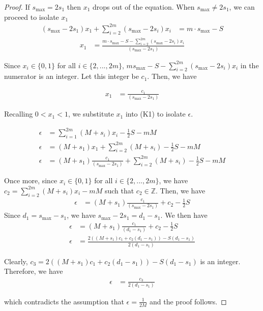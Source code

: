 \documentclass[3p, twocolumn]{elsarticle}
\begin{document}
\begin{proof}
If $s_{\max} = 2s_1$ then $x_1$ drops out of the equation.  When $s_{\max} \ne 2s_1$, we can proceed to isolate $x_1$
\begin{align*}
  (s_{\max} - 2s_1)x_1 + \sum_{i=2}^{2m} (s_{\max} - 2s_i)x_i&= m\cdot s_{\max} - S
\end{align*}
\begin{align*}
  x_1 &= \frac{m\cdot s_{\max} - S - \sum_{i=2}^{2m} (s_{\max} - 2s_i)x_i}{(s_{\max} - 2s_1)}
\end{align*}

Since $x_i \in \{0,1\}$ for all $i\in\{2,...,2m\}$, $m s_{\max} - S - \sum_{i=2}^{2m} (s_{\max} - 2s_i)x_i$ in the numerator is an integer. Let this integer be $c_1$. Then, we have

\begin{align*}
    x_1 &= \frac{c_1}{(s_{\max} - 2s_1)}
\end{align*}

Recalling $0<x_1<1$, we substitute $x_1$ into (K1) to isolate $\epsilon$.

\begin{align*}
    \epsilon &= \sum_{i=1}^{2m}(M+s_i)x_i - \frac{1}{2}S - mM \\
    \epsilon &= (M+s_1)x_1 + \sum_{i=2}^{2m}(M+s_i) - \frac{1}{2}S - mM\\
    \epsilon &= (M+s_1)\frac{c_1}{(s_{\max} - 2s_1)} + \sum_{i=2}^{2m}(M+s_i) - \frac{1}{2}S - mM 
\end{align*}

Once more, since $x_i \in \{0,1\}$ for all $i\in\{2,...,2m\}$, we have $\displaystyle c_2 = \sum_{i=2}^{2m} (M + s_i)x_i - mM$ such that $c_2 \in \mathbb{Z}$. Then, we have
\begin{align*}
    \epsilon &= (M+s_1)\frac{c_1}{(s_{\max} - 2s_1)} + c_2 - \frac{1}{2}S
\end{align*}
Since $d_1 = s_{\max} - s_1$, we have  $s_{\max} - 2s_1 = d_1 - s_1$. We then have 
\begin{align*}
    \epsilon &= (M+s_1)\frac{c_1}{(d_1 - s_1)} + c_2 - \frac{1}{2}S\\
    \epsilon &= \frac{2((M+s_1)c_1+c_2(d_1 - s_1))-S(d_1 - s_1)}{2(d_1 - s_1)}
\end{align*}

Clearly, $c_3 = 2((M+s_1)c_1+c_2(d_1 - s_1))-S(d_1 - s_1)$ is an integer. Therefore, we have 
\begin{align*}
   \epsilon &= \frac{c_3}{2(d_1 - s_1)}
\end{align*}

which contradicts the assumption that $\epsilon = \frac{1}{2M}$ and the proof follows. 

    
\end{proof}
\end{document}
